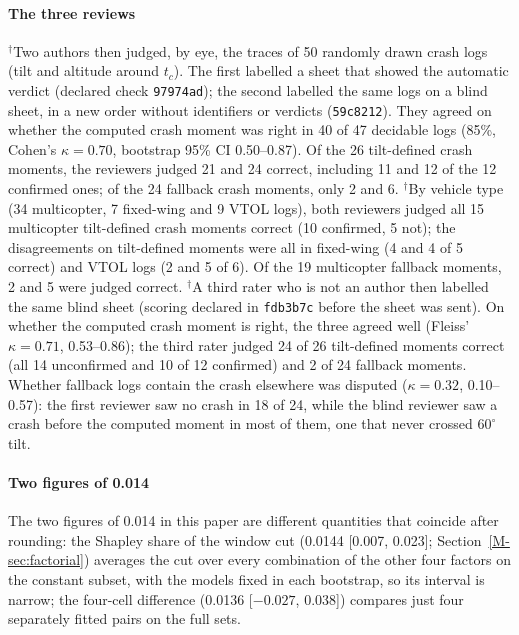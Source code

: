 \documentclass[preprint,12pt]{elsarticle}
\begin{document}
\paragraph{The three reviews} $^\dagger$Two authors then judged, by eye, the traces of 50 randomly drawn crash logs (tilt and altitude around $t_c$). The first labelled a sheet that showed the automatic verdict (declared check \texttt{97974ad}); the second labelled the same logs on a blind sheet, in a new order without identifiers or verdicts (\texttt{59c8212}). They agreed on whether the computed crash moment was right in 40 of 47 decidable logs (85\%, Cohen's $\kappa=0.70$, bootstrap 95\% CI 0.50--0.87). Of the 26 tilt-defined crash moments, the reviewers judged 21 and 24 correct, including 11 and 12 of the 12 confirmed ones; of the 24 fallback crash moments, only 2 and 6. $^\dagger$By vehicle type (34 multicopter, 7 fixed-wing and 9 VTOL logs), both reviewers judged all 15 multicopter tilt-defined crash moments correct (10 confirmed, 5 not); the disagreements on tilt-defined moments were all in fixed-wing (4 and 4 of 5 correct) and VTOL logs (2 and 5 of 6). Of the 19 multicopter fallback moments, 2 and 5 were judged correct. $^\dagger$A third rater who is not an author then labelled the same blind sheet (scoring declared in \texttt{fdb3b7c} before the sheet was sent). On whether the computed crash moment is right, the three agreed well (Fleiss' $\kappa=0.71$, 0.53--0.86); the third rater judged 24 of 26 tilt-defined moments correct (all 14 unconfirmed and 10 of 12 confirmed) and 2 of 24 fallback moments. Whether fallback logs contain the crash elsewhere was disputed ($\kappa=0.32$, 0.10--0.57): the first reviewer saw no crash in 18 of 24, while the blind reviewer saw a crash before the computed moment in most of them, one that never crossed $60^\circ$ tilt. 

\paragraph{Two figures of 0.014} The two figures of 0.014 in this paper are different quantities that coincide after rounding: the Shapley share of the window cut (0.0144 [0.007, 0.023]; Section~\ref{M-sec:factorial}) averages the cut over every combination of the other four factors on the constant subset, with the models fixed in each bootstrap, so its interval is narrow; the four-cell difference (0.0136 [$-0.027$, 0.038]) compares just four separately fitted pairs on the full sets.
\end{document}
